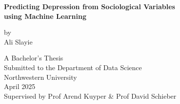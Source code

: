 \begin{titlepage}
\centering
\vspace*{2cm}

\Large\textbf{Predicting Depression from Sociological Variables}\\[0.5cm]
\Large\textbf{using Machine Learning}

\vspace{2cm}

\normalsize
by\\[0.3cm]
Ali Slayie

\vfill

A Bachelor’s Thesis\\
Submitted to the Department of Data Science\\
Northwestern University\\
April 2025\\
Supervised by Prof Arend Kuyper \& Prof David Schieber

\end{titlepage}
\newpage
